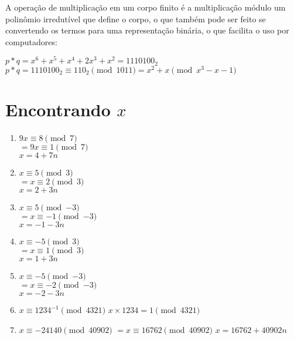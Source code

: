 \documentclass[12pt]{article}
\begin{document}
A operação de multiplicação em um corpo finito é a multiplicação módulo um
polinômio irredutível que define o corpo, o que também pode ser feito se
convertendo os termos para uma representação binária, o que facilita o uso por
computadores:

\begin{center}
    $p*q = x^{6}+x^{5}+x^{4}+2x^{3}+x^{2} = {1110100}_2$ \\
    $p*q = {1110100}_2 \equiv {110}_2 \pmod{1011} = x^{2}+x \pmod{x^{3}-x-1}$
\end{center}

\section{Encontrando $x$}

\begin{enumerate}[label=\textbf{\alph*})]
    \setlength\itemsep{1em}

    \item
        $9x \equiv 8 \pmod{7}$ \\
        $= 9x \equiv 1 \pmod{7}$ \\
        $x = 4+7n$

    \item
        $x \equiv 5 \pmod{3}$ \\
        $= x \equiv 2 \pmod{3}$ \\
        $x = 2+3n$

    \item
        $x \equiv 5 \pmod{-3}$ \\
        $= x \equiv -1 \pmod{-3}$ \\
        $x = -1-3n$

    \item
        $x \equiv -5 \pmod{3}$ \\
        $= x \equiv 1 \pmod{3}$ \\
        $x = 1+3n$

    \item
        $x \equiv -5 \pmod{-3}$ \\
        $= x \equiv -2 \pmod{-3}$ \\
        $x = -2-3n$

    \item
        $x \equiv 1234^{-1} \pmod{4321}$
        $x \times 1234 = 1 \pmod{4321}$

    \item
        $x \equiv -24140 \pmod{40902}$
        $= x \equiv 16762 \pmod{40902}$
        $x = 16762+40902n$
\end{enumerate}
\end{document}
